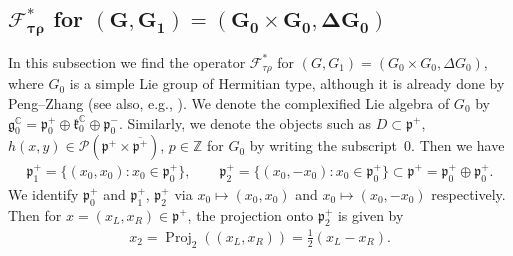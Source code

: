 \documentclass[pdftex]{sigma}
\numberwithin{equation}{section}
\newcommand{\BZ}{\mathbb{Z}}
\newcommand{\BC}{\mathbb{C}}
\newcommand{\fg}{\mathfrak{g}}
\newcommand{\fk}{\mathfrak{k}}
\newcommand{\fp}{\mathfrak{p}}
\newcommand{\cF}{\mathcal{F}}
\newcommand{\cP}{\mathcal{P}}
\newcommand{\Proj}{\operatorname{Proj}}
\begin{document}
\subsection[$\cF_{\tau\rho}^*$ for $(G,G_1)=(G_0\times G_0, \Delta G_0)$]{$\boldsymbol{\cF_{\tau\rho}^*}$ for $\boldsymbol{(G,G_1)=(G_0\times G_0, \Delta G_0)}$}
In this subsection we find the operator $\cF_{\tau\rho}^*$ for $(G,G_1)=(G_0\times G_0, \Delta G_0)$,
where $G_0$ is a simple Lie group of Hermitian type, although it is already done by Peng--Zhang \cite{PZ} (see also, e.g., \cite{BCK,OR,P}).
We denote the complexified Lie algebra of $G_0$ by $\fg_0^\BC=\fp^+_0\oplus\fk^\BC_0\oplus\fp^-_0$.
Similarly, we denote the objects such as $D\subset\fp^+$, $h(x,y)\in\cP(\fp^+\times\overline{\fp^+})$, $p\in\BZ$ for $G_0$
by writing the subscript~$0$.
Then we have
\begin{gather*} \fp^+_1=\{(x_0,x_0)\colon x_0\in\fp^+_0\},\qquad \fp^+_2=\{(x_0,-x_0)\colon x_0\in\fp^+_0\}\subset\fp^+=\fp^+_0\oplus\fp^+_0. \end{gather*}
We identify $\fp^+_0$ and $\fp^+_1$, $\fp^+_2$ via $x_0\mapsto (x_0,x_0)$ and $x_0\mapsto (x_0,-x_0)$ respectively.
Then for $x=(x_L,x_R)\in\fp^+$, the projection onto $\fp^+_2$ is given by
\begin{gather*} x_2=\Proj_2((x_L,x_R))=\tfrac{1}{2}(x_L-x_R). \end{gather*}
\end{document}
